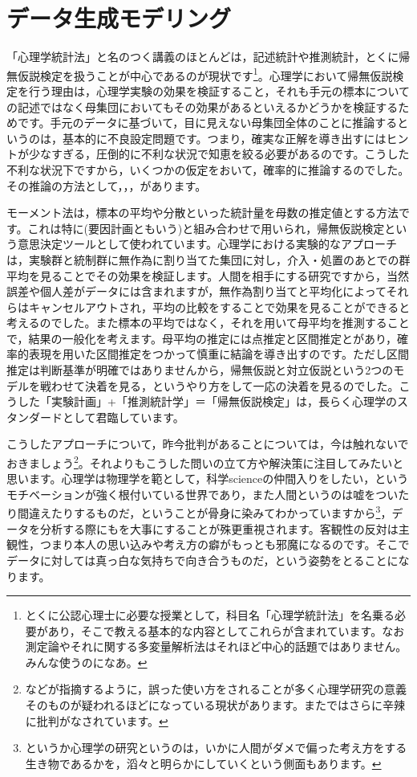 \documentclass{ltjsbook}
\begin{document}
\section{データ生成モデリング}
「心理学統計法」と名のつく講義のほとんどは，記述統計や推測統計，とくに帰無仮説検定を扱うことが中心であるのが現状です\footnote{とくに公認心理士に必要な授業として，科目名「心理学統計法」を名乗る必要があり，そこで教える基本的な内容としてこれらが含まれています。なお測定論やそれに関する多変量解析法はそれほど中心的話題ではありません。みんな使うのになあ。}。心理学において帰無仮説検定を行う理由は，心理学実験の効果を検証すること，それも手元の標本についての記述ではなく母集団においてもその効果があるといえるかどうかを検証するためです。手元のデータに基づいて，目に見えない母集団全体のことに推論するというのは，基本的に不良設定問題です。つまり，確実な正解を導き出すにはヒントが少なすぎる，圧倒的に不利な状況で知恵を絞る必要があるのです。こうした不利な状況下ですから，いくつかの仮定をおいて，確率的に推論するのでした。その推論の方法として，，，があります。

モーメント法は，標本の平均や分散といった統計量を母数の推定値とする方法です。これは特に(要因計画ともいう)と組み合わせで用いられ，帰無仮説検定という意思決定ツールとして使われています。心理学における実験的なアプローチは，実験群と統制群に無作為に割り当てた集団に対し，介入・処置のあとでの群平均を見ることでその効果を検証します。人間を相手にする研究ですから，当然誤差や個人差がデータには含まれますが，無作為割り当てと平均化によってそれらはキャンセルアウトされ，平均の比較をすることで効果を見ることができると考えるのでした。また標本の平均ではなく，それを用いて母平均を推測することで，結果の一般化を考えます。母平均の推定には点推定と区間推定とがあり，確率的表現を用いた区間推定をつかって慎重に結論を導き出すのです。ただし区間推定は判断基準が明確ではありませんから，帰無仮説と対立仮説という2つのモデルを戦わせて決着を見る，というやり方をして一応の決着を見るのでした。こうした「実験計画」+「推測統計学」＝「帰無仮説検定」は，長らく心理学のスタンダードとして君臨しています。

こうしたアプローチについて，昨今批判があることについては，今は触れないでおきましょう\footnote{\textcite{amrhein2019scientists}などが指摘するように，誤った使い方をされることが多く心理学研究の意義そのものが疑われるほどになっている現状があります。また\textcite{Toyoda202003}ではさらに辛辣に批判がなされています。}。それよりもこうした問いの立て方や解決策に注目してみたいと思います。心理学は物理学を範として，科学scienceの仲間入りをしたい，というモチベーションが強く根付いている世界であり，また人間というのは嘘をついたり間違えたりするものだ，ということが骨身に染みてわかっていますから\footnote{というか心理学の研究というのは，いかに人間がダメで偏った考え方をする生き物であるかを，滔々と明らかにしていくという側面もあります。}，データを分析する際にもを大事にすることが殊更重視されます。客観性の反対は主観性，つまり本人の思い込みや考え方の癖がもっとも邪魔になるのです。そこでデータに対しては真っ白な気持ちで向き合うものだ，という姿勢をとることになります。
\end{document}
